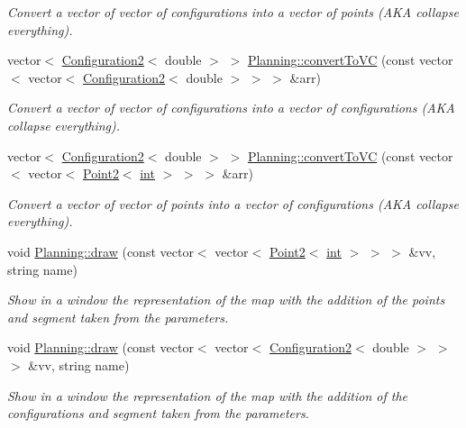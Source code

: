 \begin{DoxyCompactItemize}
\begin{DoxyCompactList}\small\item\em Convert a vector of vector of configurations into a vector of points (A\+KA collapse everything). \end{DoxyCompactList}\item 
vector$<$ \mbox{\hyperlink{class_configuration2}{Configuration2}}$<$ double $>$ $>$ \mbox{\hyperlink{namespace_planning_a6b77ef5e5628030b9f80b2ec9250e9ab}{Planning\+::convert\+To\+VC}} (const vector$<$ vector$<$ \mbox{\hyperlink{class_configuration2}{Configuration2}}$<$ double $>$ $>$ $>$ \&arr)
\begin{DoxyCompactList}\small\item\em Convert a vector of vector of configurations into a vector of configurations (A\+KA collapse everything). \end{DoxyCompactList}\item 
vector$<$ \mbox{\hyperlink{class_configuration2}{Configuration2}}$<$ double $>$ $>$ \mbox{\hyperlink{namespace_planning_adc80df7ce19138eff08f00c4c7f4c609}{Planning\+::convert\+To\+VC}} (const vector$<$ vector$<$ \mbox{\hyperlink{class_point2}{Point2}}$<$ \mbox{\hyperlink{draw_8hh_aa620a13339ac3a1177c86edc549fda9b}{int}} $>$ $>$ $>$ \&arr)
\begin{DoxyCompactList}\small\item\em Convert a vector of vector of points into a vector of configurations (A\+KA collapse everything). \end{DoxyCompactList}\item 
void \mbox{\hyperlink{namespace_planning_a11af0aafe85bf1cf4c8203c67f1e61f8}{Planning\+::draw}} (const vector$<$ vector$<$ \mbox{\hyperlink{class_point2}{Point2}}$<$ \mbox{\hyperlink{draw_8hh_aa620a13339ac3a1177c86edc549fda9b}{int}} $>$ $>$ $>$ \&vv, string name)
\begin{DoxyCompactList}\small\item\em Show in a window the representation of the map with the addition of the points and segment taken from the parameters. \end{DoxyCompactList}\item 
void \mbox{\hyperlink{namespace_planning_a2a204e9795df1a3bc7bfeb3239a39d37}{Planning\+::draw}} (const vector$<$ vector$<$ \mbox{\hyperlink{class_configuration2}{Configuration2}}$<$ double $>$ $>$ $>$ \&vv, string name)
\begin{DoxyCompactList}\small\item\em Show in a window the representation of the map with the addition of the configurations and segment taken from the parameters. \end{DoxyCompactList}\item 

\end{DoxyCompactItemize}
